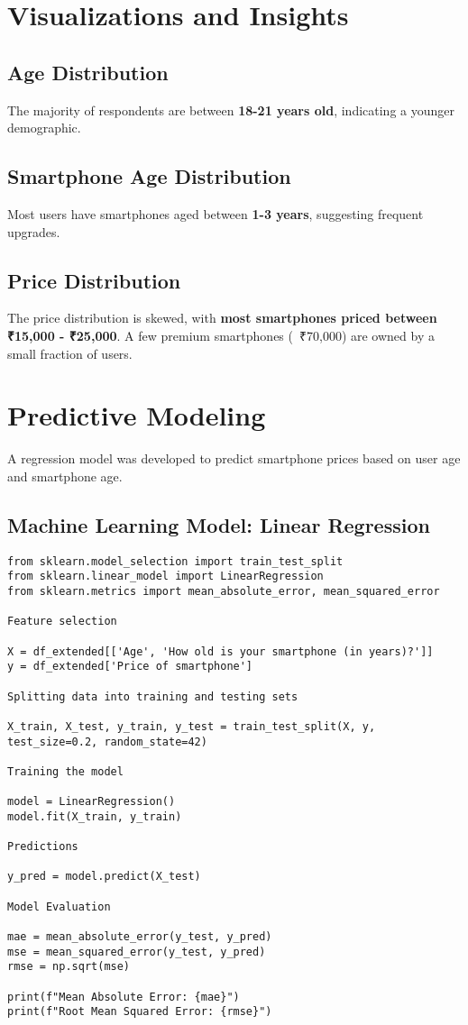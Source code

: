 \documentclass[12pt]{article}
\begin{document}
\section{Visualizations and Insights}
\subsection{Age Distribution}
The majority of respondents are between \textbf{18-21 years old}, indicating a younger demographic.

\subsection{Smartphone Age Distribution}
Most users have smartphones aged between \textbf{1-3 years}, suggesting frequent upgrades.

\subsection{Price Distribution}
The price distribution is skewed, with \textbf{most smartphones priced between ₹15,000 - ₹25,000}. A few premium smartphones (~₹70,000) are owned by a small fraction of users.

\section{Predictive Modeling}
A regression model was developed to predict smartphone prices based on user age and smartphone age.

\subsection{Machine Learning Model: Linear Regression}
\begin{verbatim}
from sklearn.model_selection import train_test_split
from sklearn.linear_model import LinearRegression
from sklearn.metrics import mean_absolute_error, mean_squared_error

Feature selection

X = df_extended[['Age', 'How old is your smartphone (in years)?']]
y = df_extended['Price of smartphone']

Splitting data into training and testing sets

X_train, X_test, y_train, y_test = train_test_split(X, y, test_size=0.2, random_state=42)

Training the model

model = LinearRegression()
model.fit(X_train, y_train)

Predictions

y_pred = model.predict(X_test)

Model Evaluation

mae = mean_absolute_error(y_test, y_pred)
mse = mean_squared_error(y_test, y_pred)
rmse = np.sqrt(mse)

print(f"Mean Absolute Error: {mae}")
print(f"Root Mean Squared Error: {rmse}")
\end{verbatim}
\end{document}
